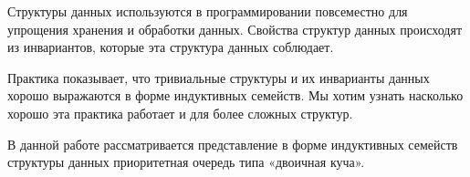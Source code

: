 \startprefacepage

Структуры данных используются в программировании повсеместно для
упрощения хранения и обработки данных.
Свойства структур данных происходят из инвариантов, которые эта структура
данных соблюдает.

Практика показывает, что тривиальные структуры и их инварианты
данных хорошо выражаются в форме индуктивных семейств.
Мы хотим узнать насколько хорошо эта практика работает и для более сложных структур.

В данной работе рассматривается представление в форме индуктивных семейств
структуры данных приоритетная очередь типа «двоичная куча».
\iffalse
hello world iffalse test
\newline
\fi


